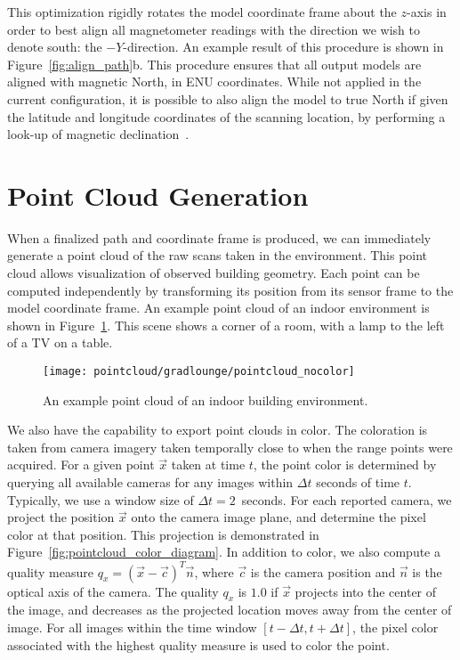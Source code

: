 \documentclass[12pt,onecolumn,oneside]{book}
\begin{document}
This optimization rigidly rotates the model coordinate frame about the $z$-axis in order to best align all magnetometer readings with the direction we wish to denote south:  the $-Y$-direction.  An example result of this procedure is shown in Figure~\ref{fig:align_path}b.  This procedure ensures that all output models are aligned with magnetic North, in ENU coordinates.  While not applied in the current configuration, it is possible to also align the model to true North if given the latitude and longitude coordinates of the scanning location, by performing a look-up of magnetic declination~\cite{MagDec}.

\section{Point Cloud Generation}
\label{sec:pointcloud}

When a finalized path and coordinate frame is produced, we can immediately generate a point cloud of the raw scans taken in the environment.  This point cloud allows visualization of observed building geometry.  Each point can be computed independently by transforming its position from its sensor frame to the model coordinate frame.  An example point cloud of an indoor environment is shown in Figure~\ref{fig:pointcloud_nocolor}.  This scene shows a corner of a room, with a lamp to the left of a TV on a table.

\begin{figure}
	\centerline{\texttt{[image: pointcloud/gradlounge/pointcloud\_nocolor]}}
	\caption{An example point cloud of an indoor building environment.}
	\label{fig:pointcloud_nocolor}
\end{figure}

We also have the capability to export point clouds in color.  The coloration is taken from camera imagery taken temporally close to when the range points were acquired.  For a given point $\vec{x}$ taken at time $t$, the point color is determined by querying all available cameras for any images within $\Delta t$ seconds of time $t$.  Typically, we use a window size of $\Delta t = 2$~seconds.  For each reported camera, we project the position $\vec{x}$ onto the camera image plane, and determine the pixel color at that position.  This projection is demonstrated in Figure~\ref{fig:pointcloud_color_diagram}.  In addition to color, we also compute a quality measure $q_x = (\vec{x} - \vec{c})^T \vec{n}$, where $\vec{c}$ is the camera position and $\vec{n}$ is the optical axis of the camera.  The quality $q_x$ is $1.0$ if $\vec{x}$ projects into the center of the image, and decreases as the projected location moves away from the center of image.  For all images within the time window $[t - \Delta t, t + \Delta t]$, the pixel color associated with the highest quality measure is used to color the point.
\end{document}
